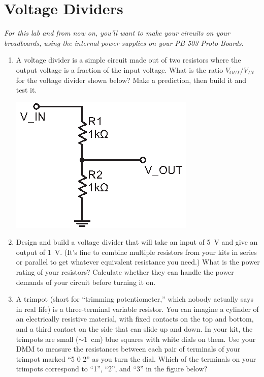 \section{Voltage Dividers}
\label{lab_voltage_dividers}


\bigskip

\textit{For this lab and from now on, you'll want to make your circuits on your breadboards, using the internal power supplies on your PB-503 Proto-Boards.}

\begin{enumerate}[wide]

\item A voltage divider is a simple circuit made out of two resistors where the output voltage is a fraction of the input voltage.  What is the ratio $V_{OUT}/V_{IN}$ for the voltage divider shown below?  Make a prediction, then build it and test it.
 
\begin{center}
\includegraphics{voltage_dividers/voltage_divider.eps}
\end{center}

\item Design and build a voltage divider that will take an input of 5~V and give an output of 1~V.  (It's fine to combine multiple resistors from your kits in series or parallel to get whatever equivalent resistance you need.)  What is the power rating of your resistors?  Calculate whether they can handle the power demands of your circuit before turning it on. \label{part_five_to_one}

\item A trimpot (short for ``trimming potentiometer,'' which nobody actually says in real life) is a three-terminal variable resistor.  You can imagine a cylinder of an electrically resistive material, with fixed contacts on the top and bottom, and a third contact on the side that can slide up and down.  In your kit, the trimpots are small ($\sim 1$~cm) blue squares with white dials on them.  Use your DMM to measure the resistances between each pair of terminals of your trimpot marked ``5 0 2'' as you turn the dial.  Which of the terminals on your trimpots correspond to ``1'', ``2'', and ``3'' in the figure below?   


\end{enumerate}
